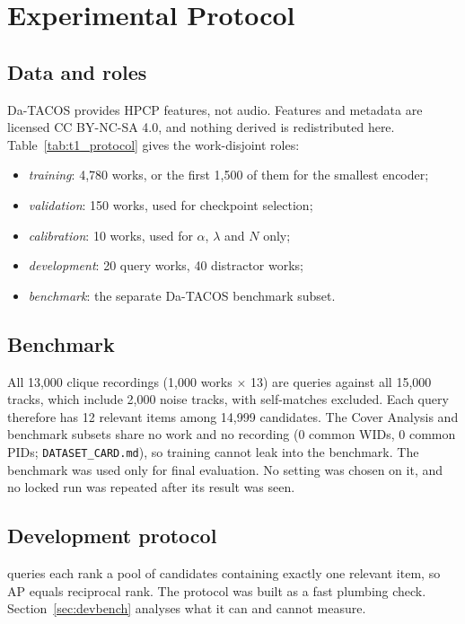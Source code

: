 \documentclass[10pt]{article}
\begin{document}
\section{Experimental Protocol}\label{sec:protocol}
\subsection{Data and roles}
Da-TACOS \citep{datacos} provides HPCP features, not audio. Features and metadata are licensed CC BY-NC-SA 4.0, and nothing derived is redistributed here. Table~\ref{tab:t1_protocol} gives the work-disjoint roles:
\begin{itemize}
\item \emph{training}: 4{,}780 works, or the first 1{,}500 of them for the smallest encoder;
\item \emph{validation}: 150 works, used for checkpoint selection;
\item \emph{calibration}: 10 works, used for $\alpha$, $\lambda$ and $N$ only;
\item \emph{development}: 20 query works, 40 distractor works;
\item \emph{benchmark}: the separate Da-TACOS benchmark subset.
\end{itemize}

\subsection{Benchmark}
All 13{,}000 clique recordings (1{,}000 works $\times$ 13) are queries against all 15{,}000 tracks, which include 2{,}000 noise tracks, with self-matches excluded. Each query therefore has 12 relevant items among 14{,}999 candidates.
The Cover Analysis and benchmark subsets share no work and no recording (0 common WIDs, 0 common PIDs; \texttt{DATASET\_CARD.md}), so training cannot leak into the benchmark. The benchmark was used only for final evaluation. No setting was chosen on it, and no locked run was repeated after its result was seen.

\subsection{Development protocol}
\DevQueries{} queries each rank a pool of \DevCandidates{} candidates containing exactly one relevant item, so AP equals reciprocal rank. The protocol was built as a fast plumbing check. Section~\ref{sec:devbench} analyses what it can and cannot measure.
\end{document}

